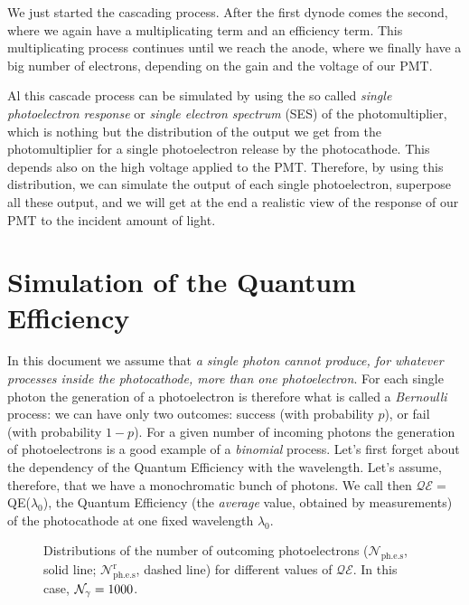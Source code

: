 \documentclass{article}
\def\QE{\ensuremath{\mathcal{QE}}\xspace}
\def\Nphot{\ensuremath{%
  \mathcal{N}_{\gamma}}\xspace}
\def\Ntrial{\ensuremath{%
  \mathcal{N}_{\mathrm{ph.e.s}}}\xspace}
\def\Nrand{\ensuremath{%
  \mathcal{N}^{\mathrm{r}}_{\mathrm{ph.e.s}}}\xspace}
\begin{document}
We just started the cascading process. After the first dynode comes
the second, where we again have a multiplicating term and an
efficiency term. This multiplicating process continues until we reach
the anode, where we finally have a big number of electrons, depending
on the gain and the voltage of our PMT.

Al this cascade process can be simulated by using the so called
\emph{single photoelectron response} or \emph{single electron
spectrum} (SES) of the photomultiplier, which is nothing but the
distribution of the output we get from the photomultiplier for a
single photoelectron release by the photocathode. This depends also on
the high voltage applied to the PMT. Therefore, by using this
distribution, we can simulate the output of each single photoelectron,
superpose all these output, and we will get at the end a realistic
view of the response of our PMT to the incident amount of light.


\section{Simulation of the Quantum Efficiency}

In this document we assume that \emph{a single photon cannot produce,
for whatever processes inside the photocathode, more than one
photoelectron}. For each single photon the generation of a
photoelectron is therefore what is called a \emph{Bernoulli} process:
we can have only two outcomes: success (with probability $p$), or fail
(with probability $1-p$). For a given number of incoming photons the
generation of photoelectrons is a good example of a \emph{binomial}
process. Let's first forget about the dependency of the Quantum
Efficiency with the wavelength. Let's assume, therefore, that we have
a monochromatic bunch of photons. We call then $\QE=$QE($\lambda_0$),
the Quantum Efficiency (the \emph{average} value, obtained by
measurements) of the photocathode at one fixed wavelength $\lambda_0$.

\begin{figure}[tb]
  \begin{center}
    \caption[Distributions of the number of outcoming photoelectrons 
    for different QE.]{Distributions of the number of outcoming
      photoelectrons (\Ntrial, solid line; \Nrand, dashed line) for
      different values of \QE. In this case, $\Nphot=1000$.}
    \label{fig:distrib1}
  \end{center}
\end{figure}
\end{document}

